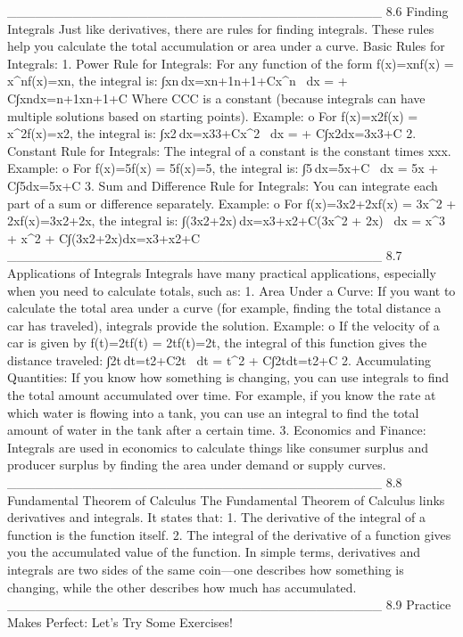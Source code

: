 ________________________________________
8.6 Finding Integrals
Just like derivatives, there are rules for finding integrals. These rules help you calculate the total accumulation or area under a curve.
Basic Rules for Integrals:
1.	Power Rule for Integrals: For any function of the form f(x)=xnf(x) = x^nf(x)=xn, the integral is:
∫xn dx=xn+1n+1+C\int x^n \, dx =  + C∫xndx=n+1xn+1+C
Where CCC is a constant (because integrals can have multiple solutions based on starting points).
Example:
o	For f(x)=x2f(x) = x^2f(x)=x2, the integral is: ∫x2 dx=x33+C\int x^2 \, dx =  + C∫x2dx=3x3+C
2.	Constant Rule for Integrals: The integral of a constant is the constant times xxx.
Example:
o	For f(x)=5f(x) = 5f(x)=5, the integral is: ∫5 dx=5x+C \, dx = 5x + C∫5dx=5x+C
3.	Sum and Difference Rule for Integrals: You can integrate each part of a sum or difference separately.
Example:
o	For f(x)=3x2+2xf(x) = 3x^2 + 2xf(x)=3x2+2x, the integral is: ∫(3x2+2x) dx=x3+x2+C\int (3x^2 + 2x) \, dx = x^3 + x^2 + C∫(3x2+2x)dx=x3+x2+C
________________________________________
8.7 Applications of Integrals
Integrals have many practical applications, especially when you need to calculate totals, such as:
1.	Area Under a Curve: If you want to calculate the total area under a curve (for example, finding the total distance a car has traveled), integrals provide the solution.
Example:
o	If the velocity of a car is given by f(t)=2tf(t) = 2tf(t)=2t, the integral of this function gives the distance traveled: ∫2t dt=t2+C\int 2t \, dt = t^2 + C∫2tdt=t2+C
2.	Accumulating Quantities: If you know how something is changing, you can use integrals to find the total amount accumulated over time. For example, if you know the rate at which water is flowing into a tank, you can use an integral to find the total amount of water in the tank after a certain time.
3.	Economics and Finance: Integrals are used in economics to calculate things like consumer surplus and producer surplus by finding the area under demand or supply curves.
________________________________________
8.8 Fundamental Theorem of Calculus
The Fundamental Theorem of Calculus links derivatives and integrals. It states that:
1.	The derivative of the integral of a function is the function itself.
2.	The integral of the derivative of a function gives you the accumulated value of the function.
In simple terms, derivatives and integrals are two sides of the same coin—one describes how something is changing, while the other describes how much has accumulated.
________________________________________
8.9 Practice Makes Perfect: Let’s Try Some Exercises!
